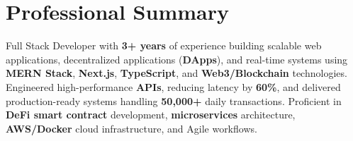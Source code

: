 \documentclass[letterpaper,11pt]{article}
\begin{document}





\section{Professional Summary}
\small{Full Stack Developer with \textbf{3+ years} of experience building scalable web applications, decentralized applications (\textbf{DApps}), and real-time systems using \textbf{MERN Stack}, \textbf{Next.js}, \textbf{TypeScript}, and \textbf{Web3/Blockchain} technologies. Engineered high-performance \textbf{APIs}, reducing latency by \textbf{60\%}, and delivered production-ready systems handling \textbf{50,000+} daily transactions. Proficient in \textbf{DeFi smart contract} development, \textbf{microservices} architecture, \textbf{AWS/Docker} cloud infrastructure, and Agile workflows.}









\end{document}
